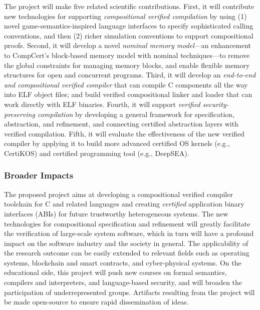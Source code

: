 The project will make five related scientific
contributions. First, it will contribute new technologies for supporting
{\em compositional verified compilation} by using (1) novel
game-semantics-inspired language interfaces to specify sophisticated
calling conventions, and then (2) richer simulation conventions
to support compositional proofs.  Second, it
will develop a novel {\em nominal memory model}---an enhancement to
CompCert's block-based memory model with nominal techniques---to
remove the global constraints for managing memory blocks, and enable
flexible memory structures for open and concurrent programs. Third, it
will develop an {\em end-to-end and compositional verified compiler}
that can compile C components all the way into ELF object files; and
build verified compositional linker and loader that can work directly
with ELF binaries.  Fourth, it will support {\em verified
security-preserving compilation} by developing a general framework for
specification, abstraction, and refinement, and connecting certified
abstraction layers with verified compilation. Fifth, it will evaluate the
effectiveness of the new verified compiler by applying it to build
more advanced certified OS kernels (e.g., CertiKOS) and certified
programming tool (e.g., DeepSEA).

\subsubsection*{Broader Impacts}

The proposed project aims at developing a compositional verified
compiler toolchain for C and related languages and creating {\em
certified} application binary interfaces (ABIs) for future trustworthy
heterogeneous systems. The new technologies for compositional
specification and refinement will greatly facilitate the verification
of large-scale system software, which in turn will have a profound impact
on the software industry and the society in general. The applicability
of the research outcome can be easily extended to relevant fields such
as operating systems, blockchain and smart contracts, and
cyber-physical systems.  On the educational side, this project will
push new courses on formal semantics, compilers and interpreters, and
language-based security, and will broaden the participation of
underrepresented groups.  Artifacts resulting from the project will be
made open-source to ensure rapid dissemination of ideas.

